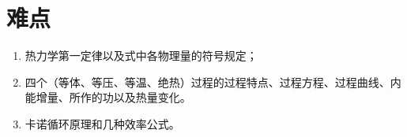 \section{难点}

\begin{enumerate}
    \item 热力学第一定律以及式中各物理量的符号规定；
    \item 四个（等体、等压、等温、绝热）过程的过程特点、过程方程、过程曲线、内能增量、所作的功以及热量变化。
    \item 卡诺循环原理和几种效率公式。
\end{enumerate}
